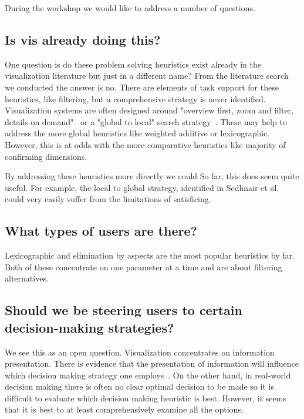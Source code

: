 During the workshop we would like to address a number of questions.

\subsection{Is vis already doing this?}
\label{is-vis-already-doing-this}

One question is do these problem solving heuristics exist already in the
visualization literature but just in a different name? From the literature
search we conducted the answer is no. There are elements of task support for
these heuristics, like filtering, but a comprehensive strategy is never
identified. Visualization systems are often designed around 
"overview first, zoom and filter, details on demand"~\cite{Shneiderman} or
a "global to local" search strategy~\cite{Sedlmair:2014}. These may help to
address the more global heuristics like weighted additive or lexicographic.
However, this is at odds with the more comparative heuristics like majority
of confirming dimensions. 

By addressing these heuristics more directly we could 
So far, this does seem quite useful. For example, the local to global
strategy, identified in Sedlmair et al.~\citep{Sedlmair:2014} could very
easily suffer from the limitations of satisficing.


\subsection{What types of users are there?}
\label{what-types-of-users-are-there}

Lexicographic and elimination by aspects are the most popular heuristics
by far. Both of these concentrate on one parameter at a time and are
about filtering alternatives.

\subsection{Should we be steering users to certain decision-making strategies?}

We see this as an open question. Visualization concentrates on information
presentation. There is evidence that the presentation of information
will influence which decision making strategy one employs~\citep{ref}.
On the other hand, in real-world decision making there is often no clear
optimal decision to be made so it is difficult to evaluate which decision
making heuristic is best. However, it seems that it is best to at least
comprehensively examine all the options.

